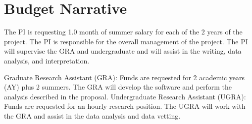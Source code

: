 \documentclass[12pt, preprint]{hacked-aastex}
\begin{document}


\clearpage
\section{Budget Narrative}\label{sec:budget}

 The PI is requesting 1.0 month of
summer salary for each of the 2 years of the project.  The PI is
responsible for the overall management of the project. The PI will
supervise the GRA and undergraduate and will assist in the writing,
data analysis, and interpretation.

 Graduate Research Assistant (GRA):
Funds are requested for 2 academic years (AY) plus 2 summers. The GRA
will develop the software and perform the analysis described in the
proposal. Undergraduate Research Assistant (UGRA): Funds are requested
for an hourly research position. The UGRA will work with the GRA and
assist in the data analysis and data vetting.
\end{document}

